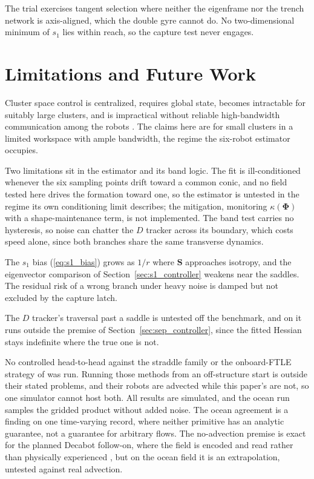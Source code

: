 \documentclass[lettersize,journal]{IEEEtran}
\begin{document}
The trial exercises tangent selection where neither the eigenframe nor the
trench network is axis-aligned, which the double gyre cannot do. No
two-dimensional minimum of $s_1$ lies within reach, so the capture test
never engages.

\section{Limitations and Future Work}
\label{sec:disc_limits}

Cluster space control is centralized, requires global state, becomes intractable
for suitably large clusters, and is impractical without reliable
high-bandwidth communication among the robots \cite{31}. The claims here
are for small clusters in a limited workspace with ample bandwidth, the
regime the six-robot estimator occupies.

Two limitations sit in the estimator and its band logic. The fit is
ill-conditioned whenever the six sampling points drift toward a common
conic, and no field tested here drives the formation toward one, so the
estimator is untested in the regime its own conditioning limit
describes; the mitigation, monitoring $\kappa(\boldsymbol{\Phi})$ with a
shape-maintenance term, is not implemented. The band test carries no
hysteresis, so noise can chatter the $D$ tracker across its boundary,
which costs speed alone, since both branches share the same transverse
dynamics.

The $s_1$ bias (\ref{eq:s1_bias}) grows as $1/r$ where $\mathbf{S}$
approaches isotropy, and the eigenvector comparison of
Section~\ref{sec:s1_controller} weakens near the saddles. The residual risk
of a wrong branch under heavy noise is damped but not excluded by the
capture latch.

The $D$ tracker's traversal past a saddle is untested off the benchmark,
and on it runs outside the premise of
Section~\ref{sec:sep_controller}, since the fitted Hessian stays
indefinite where the true one is not.

No controlled head-to-head against the straddle family \cite{26,27,28} or the onboard-FTLE strategy of \cite{30} was run. Running those methods from an off-structure start is outside their stated problems, and their robots are advected while this paper's are not, so one simulator cannot host both.
All results are simulated, and the ocean run samples the gridded product without added noise. The ocean agreement is a finding on one time-varying record, where
neither primitive has an analytic guarantee, not a guarantee for arbitrary
flows. The no-advection premise is exact for the
planned Decabot follow-on, where the field is encoded and read rather
than physically experienced \cite{34}, but on the ocean field it is an
extrapolation, untested against real advection.
\end{document}
